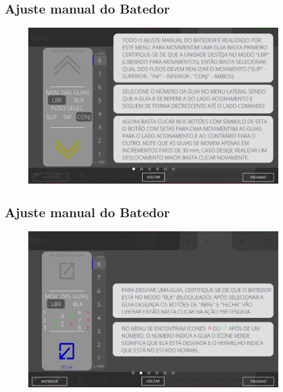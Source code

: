 \thispagestyle{fancy}
\vspace*{40 pt}
\subsection{Ajuste manual do Batedor}
\vspace*{\fill}
\begin{figure}[h]
    \centering
    \includegraphics[width=480 px,height=300 px]{src/imagesICV/07-scout/commands/1.png}
\end{figure}
\vspace*{\fill}

\newpage
\thispagestyle{fancy}
\vspace*{40 pt}
\subsection{Ajuste manual do Batedor}
\vspace*{\fill}
\begin{figure}[h]
    \centering
    \includegraphics[width=576 px,height=360 px]{src/imagesICV/07-scout/commands/2.png}
\end{figure}
\vspace*{\fill}

